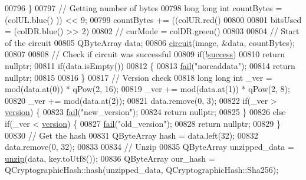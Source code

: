 \begin{DoxyCode}
00796     \}
00797     \textcolor{comment}{// Getting number of bytes}
00798     \textcolor{keywordtype}{long} \textcolor{keywordtype}{long} \textcolor{keywordtype}{int} countBytes = (colUL.blue() %
      )) << 9;
00799     countBytes += ((colUR.red() %
00800 
00801     bitsUsed = (colDR.blue() >> 2) %
00802     \textcolor{comment}{// curMode = colDR.green() %
00803 
00804     \textcolor{comment}{// Start of the circuit}
00805     QByteArray data;
00806     \hyperlink{class_model_p_c_a1d0091062a0c836b283ec2f67411623b}{circuit}(image, &data, countBytes);
00807 
00808     \textcolor{comment}{// Check if circuit was successful}
00809     \textcolor{keywordflow}{if}(!\hyperlink{class_model_p_c_a945ffbbc44a832b953c191debd448f4c}{success})
00810         \textcolor{keywordflow}{return} \textcolor{keyword}{nullptr};
00811     \textcolor{keywordflow}{if}(data.isEmpty())
00812     \{
00813         \hyperlink{class_model_p_c_a47464b59b7e37fcee25e55475708aabd}{fail}(\textcolor{stringliteral}{"noreaddata"});
00814         \textcolor{keywordflow}{return} \textcolor{keyword}{nullptr};
00815 
00816     \}
00817     \textcolor{comment}{// Version check}
00818     \textcolor{keywordtype}{long} \textcolor{keywordtype}{long} \textcolor{keywordtype}{int} \_ver = mod(data.at(0)) * qPow(2, 16);
00819     \_ver += mod(data.at(1)) * qPow(2, 8);
00820     \_ver += mod(data.at(2));
00821     data.remove(0, 3);
00822     \textcolor{keywordflow}{if}(\_ver > \hyperlink{class_model_p_c_a5af48ab89e19be42a94c34ba00249401}{version}) \{
00823         \hyperlink{class_model_p_c_a47464b59b7e37fcee25e55475708aabd}{fail}(\textcolor{stringliteral}{"new\_version"});
00824         \textcolor{keywordflow}{return} \textcolor{keyword}{nullptr};
00825     \}
00826     \textcolor{keywordflow}{else} \textcolor{keywordflow}{if}(\_ver < \hyperlink{class_model_p_c_a5af48ab89e19be42a94c34ba00249401}{version}) \{
00827         \hyperlink{class_model_p_c_a47464b59b7e37fcee25e55475708aabd}{fail}(\textcolor{stringliteral}{"old\_version"});
00828         \textcolor{keywordflow}{return} \textcolor{keyword}{nullptr};
00829     \}
00830     \textcolor{comment}{// Get the hash}
00831     QByteArray hash = data.left(32);
00832     data.remove(0, 32);
00833 
00834     \textcolor{comment}{// Unzip}
00835     QByteArray unzipped\_data = \hyperlink{class_model_p_c_a6da88f166785a49f73b22c169f956fd0}{unzip}(data, key.toUtf8());
00836     QByteArray our\_hash = QCryptographicHash::hash(unzipped\_data, QCryptographicHash::Sha256);
}
\end{DoxyCode}
